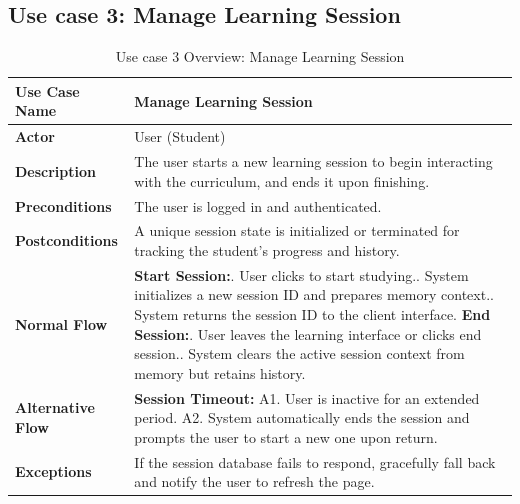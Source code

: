 \subsection{Use case 3: Manage Learning Session}
\begin{table}[H]
    \centering
    \renewcommand{\arraystretch}{1.5}
    \begin{tabularx}{\textwidth}{|l|X|}
        \hline
        \textbf{Use Case Name} & Manage Learning Session \\
        \hline
        \textbf{Actor} & User (Student) \\
        \hline
        \textbf{Description} & The user starts a new learning session to begin interacting with the curriculum, and ends it upon finishing. \\
        \hline
        \textbf{Preconditions} & The user is logged in and authenticated. \\
        \hline
        \textbf{Postconditions} & A unique session state is initialized or terminated for tracking the student's progress and history. \\
        \hline
        \textbf{Normal Flow} & 
        \textbf{Start Session:}\newline
        1. User clicks to start studying.\newline
        2. System initializes a new session ID and prepares memory context.\newline
        3. System returns the session ID to the client interface.\newline
        \textbf{End Session:}\newline
        4. User leaves the learning interface or clicks end session.\newline
        5. System clears the active session context from memory but retains history. \\
        \hline
        \textbf{Alternative Flow} & 
        \textbf{Session Timeout:}\newline
        A1. User is inactive for an extended period.\newline
        A2. System automatically ends the session and prompts the user to start a new one upon return. \\
        \hline
        \textbf{Exceptions} & If the session database fails to respond, gracefully fall back and notify the user to refresh the page. \\
        \hline
    \end{tabularx}
    \caption{Use case 3 Overview: Manage Learning Session}\label{tab:uc3}
\end{table}

